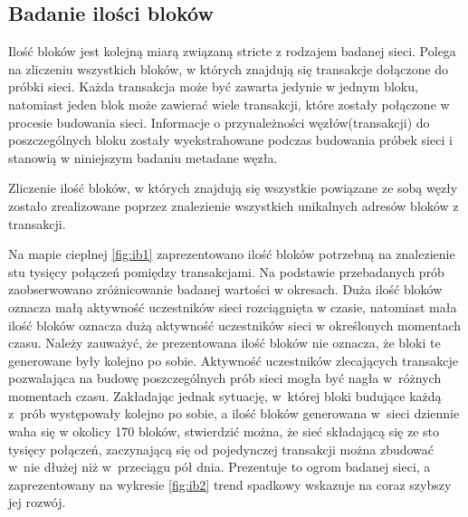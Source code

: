 \documentclass[12pt, twoside, final, openany]{mgr}
\begin{document}
\newpage
\subsection{Badanie ilości bloków}
\label{ilosc_blokow}
\indent Ilość bloków jest kolejną miarą związaną stricte z rodzajem badanej sieci. Polega na zliczeniu wszystkich bloków, w których znajdują się transakcje dołączone do próbki sieci. Każda transakcja może być zawarta jedynie w jednym bloku, natomiast jeden blok może zawierać wiele transakcji, które zostały połączone w procesie budowania sieci. Informacje o przynależności węzłów(transakcji) do poszczególnych bloku zostały wyekstrahowane podczas budowania próbek sieci i stanowią w niniejszym badaniu metadane węzła. 

\indent Zliczenie ilość bloków, w których znajdują się wszystkie powiązane ze sobą węzły zostało zrealizowane poprzez znalezienie wszystkich unikalnych adresów bloków z transakcji.

\indent Na mapie cieplnej \ref{fig:ib1} zaprezentowano ilość bloków potrzebną na znalezienie stu tysięcy połączeń pomiędzy transakcjami. Na podstawie przebadanych prób zaobserwowano zróżnicowanie badanej wartości w okresach. Duża ilość bloków oznacza małą aktywność uczestników sieci rozciągnięta w czasie, natomiast mała ilość bloków oznacza dużą aktywność uczestników sieci w określonych momentach czasu. Należy zauważyć, że prezentowana ilość bloków nie oznacza, że bloki te generowane były kolejno po sobie. Aktywność uczestników zlecających transakcje pozwalająca na budowę  poszczególnych prób sieci mogła być nagła w~różnych momentach czasu. Zakładając jednak sytuację, w~której bloki budujące każdą z~prób występowały kolejno po sobie, a ilość bloków generowana w~sieci dziennie waha się w okolicy 170 bloków, stwierdzić można, że sieć składającą się ze sto tysięcy połączeń, zaczynającą się od pojedynczej transakcji można zbudować w~nie dłużej niż w~przeciągu pół dnia. Prezentuje to ogrom badanej sieci, a zaprezentowany na wykresie \ref{fig:ib2} trend spadkowy wskazuje na coraz szybszy jej rozwój. 
\end{document}
